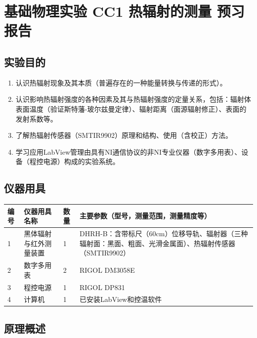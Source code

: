 \documentclass[dvipsnames, svgnames,a4paper,11pt]{article}
\begin{document}
\clearpage

\setcounter{section}{0}
\section{基础物理实验  \quad CC1 热辐射的测量 \heiti 预习报告}

	
\subsection{实验目的}
\begin{enumerate}
	\item 认识热辐射现象及其本质（普遍存在的一种能量转换与传递的形式）。
	\item 认识影响热辐射强度的各种因素及其与热辐射强度的定量关系，包括：辐射体表面温度（验证斯特藩-玻尔兹曼定律）、辐射距离（面源辐射修正）、表面的发射系数等。
	\item 了解热辐射传感器（SMTIR9902）原理和结构、使用（含校正）方法。
	\item 学习应用LabView管理由具有NI通信协议的非NI专业仪器（数字多用表）、设备（程控电源）构成的实验系统。
	 
\end{enumerate}

\subsection{仪器用具}
\begin{table}[htbp]
	\centering
	\renewcommand\arraystretch{1.6}
	\begin{tabular}{p{}|p{}|p{}|p{}}
	\hline
	编号& 仪器用具名称 & 数量 &  主要参数（型号，测量范围，测量精度等） \\
	\hline
	1&黑体辐射与红外测量装置&1 &	DHRH-B：含带标尺（60cm）位移导轨、辐射器（三种辐射面：黑面、粗面、光滑金属面）、热辐射传感器（SMTIR9902）  \\

	2&数字多用表 &2 &RIGOL DM3058E \\
	
	3&程控电源 & 1 & RIGOL DP831\\
	
	4&计算机&1 &已安装LabView和控温软件 \\
	\hline
\end{tabular}
\end{table}

\subsection{原理概述}
\end{document}
